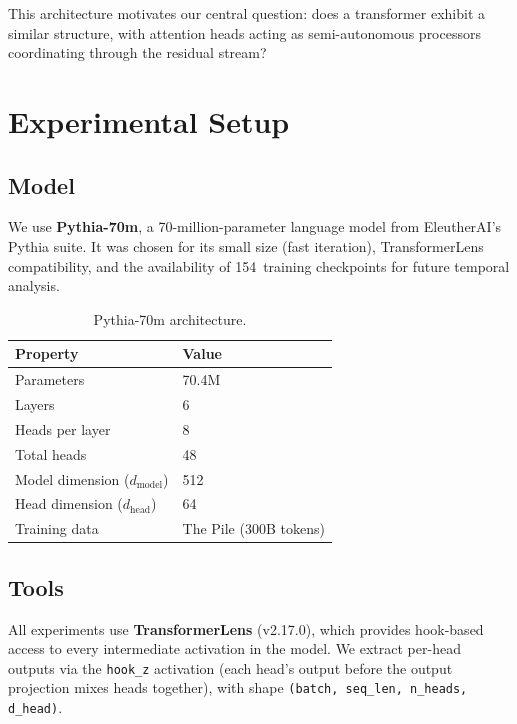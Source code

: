 \documentclass[11pt,a4paper]{article}
\begin{document}
This architecture motivates our central question: does a transformer exhibit a similar structure, with attention heads acting as semi-autonomous processors coordinating through the residual stream?

\section{Experimental Setup}
\label{sec:setup}

\subsection{Model}

We use \textbf{Pythia-70m}, a 70-million-parameter language model from EleutherAI's Pythia suite.
It was chosen for its small size (fast iteration), TransformerLens compatibility, and the availability of 154~training checkpoints for future temporal analysis.

\begin{table}[h]
\centering
\begin{tabular}{ll}
\toprule
Property & Value \\
\midrule
Parameters & 70.4M \\
Layers & 6 \\
Heads per layer & 8 \\
Total heads & 48 \\
Model dimension ($d_\text{model}$) & 512 \\
Head dimension ($d_\text{head}$) & 64 \\
Training data & The Pile (300B tokens) \\
\bottomrule
\end{tabular}
\caption{Pythia-70m architecture.}
\end{table}

\subsection{Tools}

All experiments use \textbf{TransformerLens} (v2.17.0), which provides hook-based access to every intermediate activation in the model.
We extract per-head outputs via the \texttt{hook\_z} activation (each head's output before the output projection mixes heads together), with shape \texttt{(batch, seq\_len, n\_heads, d\_head)}.
\end{document}
